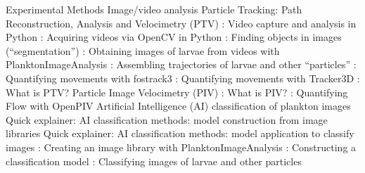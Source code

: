 \documentclass[10pt,a4paper]{article}
\begin{document}
\begin{outline}[enumerate]
\1 Experimental Methods
	\2 Image/video analysis
	\2 Particle Tracking: Path Reconstruction, Analysis and Velocimetry (PTV)
		\3 \QE: Video capture and analysis in Python
		\3 \NB: Acquiring videos via OpenCV in Python
		\3 \QE: Finding objects in images (``segmentation'')
		\3 \NB: Obtaining images of larvae from videos with PlanktonImageAnalysis 
		\3 \QE: Assembling trajectories of larvae and other ``particles'' 
		\3 \NB: Quantifying movements with fostrack3
		\3 \NB: Quantifying movements with Tracker3D
		\3 \QE: What is PTV?
	\2 Particle Image Velocimetry (PIV)
		\3 \QE: What is PIV?
		\3 \NB: Quantifying Flow with OpenPIV
	\2 Artificial Intelligence (AI) classification of plankton images
		\3 Quick explainer: AI classification methods: model construction from image libraries
		\3 Quick explainer: AI classification methods: model application to classify images
		\3 \NB: Creating an image library with PlanktonImageAnalysis
		\3 \NB: Constructing a classification model
		\3 \NB: Classifying images of larvae and other particles

		





\end{outline}































	
	
	
	
	
	
	
	
	
	
	
	
	
	
	
	
	
	
	
	
	
	
	
	
	
\end{document}
